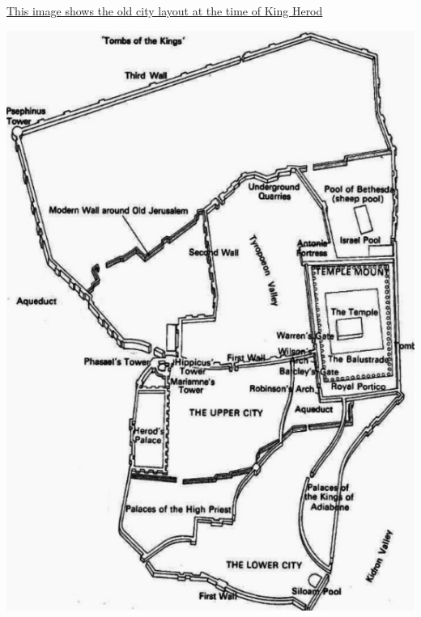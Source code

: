 \documentclass[letterpaper]{report}
\begin{document}
\href{http://www.jesus-story.net/maps_jesus.htm}{
	This image shows the old city layout at the time of King Herod}

\includegraphics[height=0.9\textheight]{JerusalemAsItWas}

\clearpage
\end{document}
